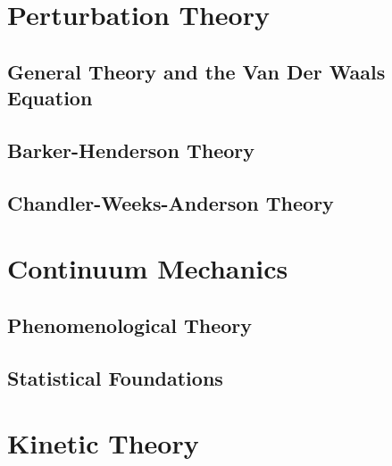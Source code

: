 \documentclass[a4paper,11pt]{article}
\begin{document}
\newpage
\section{Perturbation Theory}
\subsection{General Theory and the Van Der Waals Equation}
\subsection{Barker-Henderson Theory}
\subsection{Chandler-Weeks-Anderson Theory}

\newpage
\section{Continuum Mechanics}
\subsection{Phenomenological Theory}
\subsection{Statistical Foundations}

\newpage
\section{Kinetic Theory}
\end{document}
